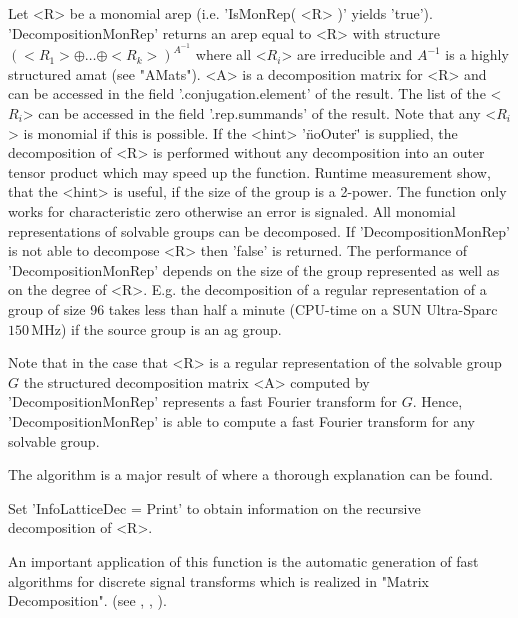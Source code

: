 Let <R> be a monomial arep (i.e. 'IsMonRep( <R> )' yields 'true'). 
'DecompositionMonRep' returns an arep equal to <R> with 
structure $(<R_1>\oplus\dots\oplus <R_k>)^{A^{-1}}$ where all
<$R_i$> are irreducible and $A^{-1}$ is a highly structured 
amat (see "AMats"). <A> is a decomposition matrix for <R> and 
can be accessed in the field '.conjugation.element' of the result.
The list of the <$R_i$> can be accessed in the field
'.rep.summands' of the result. Note that any <$R_i$> is monomial if
this is possible.
If the <hint> '\"noOuter\"' is supplied, the decomposition
of <R> is performed without any decomposition into 
an outer tensor product which may speed up the function.
Runtime measurement show, that the <hint> is useful, if the
size of the group is a 2-power.
The function only works for characteristic zero otherwise an error
is signaled. 
All monomial representations of solvable groups can be decomposed.
If 'DecompositionMonRep' is not able to decompose <R> then 'false' is
returned.
The performance of 'DecompositionMonRep' depends on the size of the 
group represented as well as on the degree of <R>. E.g. the 
decomposition of a regular representation of a group of size 96 
takes less than half a minute 
(CPU-time on a SUN Ultra-Sparc $150\,\mathrm{MHz}$) if the 
source group is an ag group.
 
Note that in the case that <R> is a regular representation of the
solvable group $G$ the structured decomposition matrix <A> computed by
'DecompositionMonRep' represents a fast Fourier transform for $G$. 
Hence, 'DecompositionMonRep' is able to compute a fast Fourier
transform for any solvable group.

The algorithm is a major result of \cite{Pue99} where a thorough
explanation can be found.

Set 'InfoLatticeDec \:= Print' to obtain information on 
the recursive decomposition of <R>.

An important application of this function is the automatic generation
of fast algorithms for discrete signal transforms which is realized
in "Matrix Decomposition".
(see \cite{Min93}, \cite{Egn97}, \cite{Pue99}).

